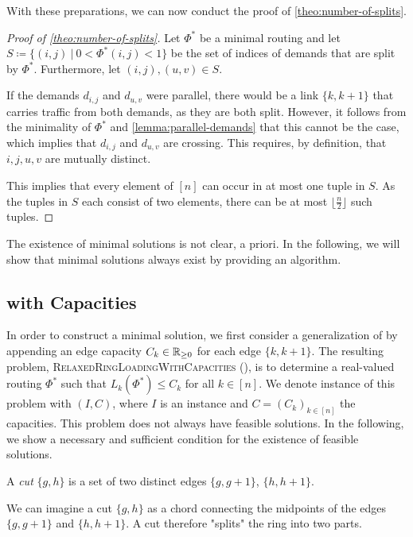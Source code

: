 With these preparations, we can now conduct the proof of \cref{theo:number-of-splits}.
\begin{proof}[Proof of \cref{theo:number-of-splits}]
	Let $\Phi^\ast$ be a minimal routing and let $S \coloneqq \{(i, j)\ |\ 0 < \Phi^\ast(i, j) < 1\}$ be the set of indices of demands that are split by $\Phi^\ast$.
	Furthermore, let $(i, j), (u, v) \in S$.
	
	If the demands $d_{i,j}$ and $d_{u, v}$ were parallel, there would be a link $\{k, k+1\}$ that carries traffic from both demands, as they are both split.
	However, it follows from the minimality of $\Phi^\ast$ and \cref{lemma:parallel-demands} that this cannot be the case, which implies that $d_{i,j}$ and $d_{u, v}$ are crossing.
	This requires, by definition, that $i, j, u, v$ are mutually distinct.
	
	This implies that every element of $[n]$ can occur in at most one tuple in $S$.
	As the tuples in $S$ each consist of two elements, there can be at most $\lfloor\frac{n}{2}\rfloor$ such tuples.
\end{proof}

The existence of minimal solutions is not clear, a priori.
In the following, we will show that minimal solutions always exist by providing an algorithm.

\subsection{\RRL with Capacities}

In order to construct a minimal solution, we first consider a generalization of \RRL by appending an edge capacity $C_k \in \mathbb{R}_{\geq 0}$ for each edge $\{k, k+1\}$.
The resulting problem, \textsc{RelaxedRingLoadingWithCapacities} (\RRLWC), is to determine a real-valued routing $\Phi^\ast$ such that $L_k(\Phi^\ast) \leq C_k$ for all $k \in [n]$.
We denote instance of this problem with $(I, C)$, where $I$ is an \RRL instance and $C = (C_k)_{k \in [n]}$ the capacities.
This problem does not always have feasible solutions.
In the following, we show a necessary and sufficient condition for the existence of feasible solutions.

\begin{definition}
	A \emph{cut} $\{g, h\}$ is a set of two distinct edges $\{g, g+1\}$, $\{h, h+1\}$.
\end{definition}

We can imagine a cut $\{g, h\}$ as a chord connecting the midpoints of the edges $\{g, g+1\}$ and $\{h, h+1\}$.
A cut therefore "splits" the ring into two parts.

